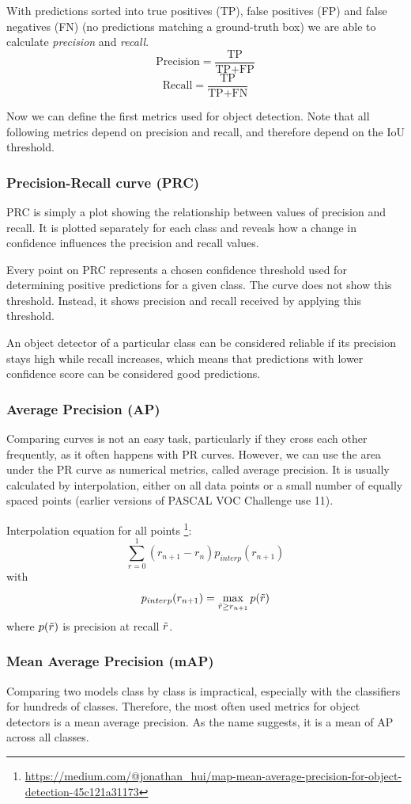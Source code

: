 With predictions sorted into true positives (TP), false positives (FP) and false negatives (FN) (no predictions matching a ground-truth box) we are able to calculate \textit{precision} and \textit{recall}.
$$\text{Precision} = \frac{\text{TP}}{\text{TP}+\text{FP}}$$
$$\text{Recall} = \frac{\text{TP}}{\text{TP}+\text{FN}}$$

Now we can define the first metrics used for object detection. Note that all following metrics depend on precision and recall, and therefore depend on the IoU threshold.

\subsubsection{Precision-Recall curve (PRC)}
PRC is simply a plot showing the relationship between values of precision and recall. It is plotted separately for each class and reveals how a change in confidence influences the precision and recall values. 

Every point on PRC represents a chosen confidence threshold used for determining positive predictions for a given class. The curve does not show this threshold. Instead, it shows precision and recall received by applying this threshold.

An object detector of a particular class can be considered reliable if its precision stays high while recall increases, which means that predictions with lower confidence score can be considered good predictions.

\subsubsection{Average Precision (AP)}
Comparing curves is not an easy task, particularly if they cross each other frequently, as it often happens with PR curves. However, we can use the area under the PR curve as numerical metrics, called average precision. It is usually calculated by interpolation, either on all data points or a small number of equally spaced points (earlier versions of PASCAL VOC Challenge use 11).

Interpolation equation for all points \footnote{\url{https://medium.com/@jonathan\_hui/map-mean-average-precision-for-object-detection-45c121a31173}}:
$$\sum_{r=0}^1 (r_{n+1} - r_n ) p_{interp}(r_{n+1})$$
with
$$p_{interp}(r_{n+1}) = \max_{\Tilde{r} \geq r_{n+1}} p(\Tilde{r})$$
where $p(\Tilde{r})$ is precision at recall $\Tilde{r}$.

\subsubsection{Mean Average Precision (mAP)}
Comparing two models class by class is impractical, especially with the classifiers for hundreds of classes. Therefore, the most often used metrics for object detectors is a mean average precision. As the name suggests, it is a mean of AP across all classes.

